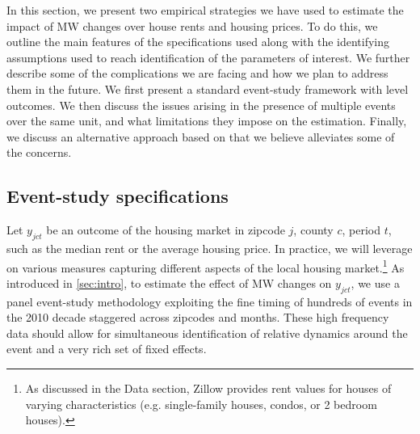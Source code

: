 
In this section, we present two empirical strategies we have used to estimate the impact of MW changes over house rents and housing prices. To do this, we outline the main features of the specifications used along with the identifying assumptions used to reach identification of the parameters of interest. We further describe some of the complications we are facing and how we plan to address them in the future. We first present a standard event-study framework with level outcomes. We then discuss the issues arising in the presence of multiple events over the same unit, and what limitations they impose on the estimation. Finally, we discuss an alternative approach based on  that we believe alleviates some of the concerns.

\subsection{Event-study specifications} \label{subsec:empirical_strategy/event-study}

    Let $y_{jct}$ be an outcome of the housing market in zipcode $j$, county $c$, period $t$, such as the median rent or the average housing price. In practice, we will leverage on various measures capturing different aspects of the local housing market.\footnote{As discussed in the Data section, Zillow provides rent values for houses of varying characteristics (e.g. single-family houses, condos, or 2 bedroom houses).} As introduced in \autoref{sec:intro}, to estimate the effect of MW changes on $y_{jct}$, we use a panel event-study methodology exploiting the fine timing of hundreds of events in the 2010 decade staggered across zipcodes and months. These high frequency data should allow for simultaneous identification of relative dynamics around the event and a very rich set of fixed effects.
    

